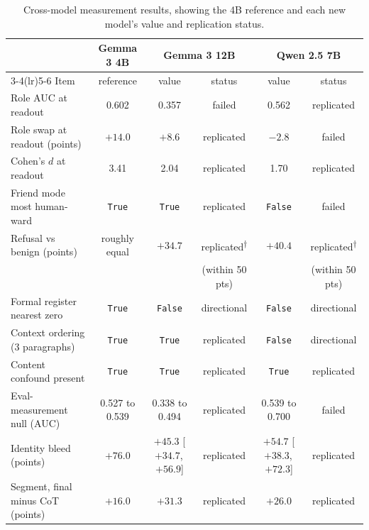 \begin{table}[!ht]
\caption{Cross-model measurement results, showing the 4B reference and each
new model's value and replication status.}
\label{tab:crossmodel}
\centering
\scriptsize
\setlength{\tabcolsep}{3pt}
\begin{tabular}{lccccc}
\toprule
& \textbf{Gemma 3 4B} & \multicolumn{2}{c}{\textbf{Gemma 3 12B}} & \multicolumn{2}{c}{\textbf{Qwen 2.5 7B}} \\
\cmidrule(lr){3-4}\cmidrule(lr){5-6}
Item & reference & value & status & value & status \\
\midrule
Role AUC at readout               & 0.602          & 0.357 & failed      & 0.562  & replicated \\
Role swap at readout (points)     & $+14.0$        & $+8.6$ & replicated & $-2.8$ & failed \\
Cohen's $d$ at readout            & 3.41           & 2.04  & replicated  & 1.70   & replicated \\
Friend mode most human-ward       & \texttt{True}  & \texttt{True}  & replicated  & \texttt{False} & failed \\
Refusal vs benign (points)        & roughly equal  & $+34.7$ & replicated\textsuperscript{\ensuremath{\dagger}} & $+40.4$ & replicated\textsuperscript{\ensuremath{\dagger}} \\
 & & & (within 50 pts) & & (within 50 pts) \\
Formal register nearest zero      & \texttt{True}  & \texttt{False} & directional & \texttt{False} & directional \\
Context ordering (3 paragraphs)   & \texttt{True}  & \texttt{True}  & replicated  & \texttt{False} & directional \\
Content confound present          & \texttt{True}  & \texttt{True}  & replicated  & \texttt{True}  & replicated \\
Eval-measurement null (AUC)       & 0.527 to 0.539 & 0.338 to 0.494 & replicated & 0.539 to 0.700 & failed \\
Identity bleed (points)           & $+76.0$        & $+45.3$ [$+34.7$,\,$+56.9$] & replicated & $+54.7$ [$+38.3$,\,$+72.3$] & replicated \\
Segment, final minus CoT (points) & $+16.0$        & $+31.3$ & replicated & $+26.0$ & replicated \\
\bottomrule
\end{tabular}
\par\smallskip
\begin{minipage}{\linewidth}\scriptsize

\end{minipage}
\end{table}
